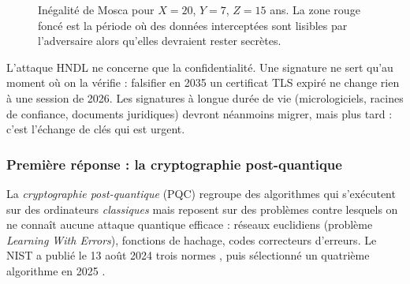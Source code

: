 \begin{figure}[!ht]
\centering
{}
\caption{Inégalité de Mosca pour $X=20$, $Y=7$, $Z=15$ ans. La zone rouge foncé est la période où des données
interceptées sont lisibles par l'adversaire alors qu'elles devraient rester secrètes.}
\label{fig:mosca}
\end{figure}

\begin{remarque}
L'attaque HNDL ne concerne que la confidentialité. Une signature ne sert qu'au moment où on la vérifie : falsifier en 2035 un
certificat TLS expiré ne change rien à une session de 2026. Les signatures à longue durée de vie (micrologiciels,
racines de confiance, documents juridiques) devront néanmoins migrer, mais plus tard : c'est l'échange de clés qui est
urgent.
\end{remarque}

\subsubsection{Première réponse : la cryptographie post-quantique}

La \emph{cryptographie post-quantique} (PQC) regroupe des algorithmes qui s'exécutent sur des ordinateurs
\emph{classiques} mais reposent sur des problèmes contre lesquels on ne connaît aucune attaque quantique efficace :
réseaux euclidiens (problème \emph{Learning With Errors}), fonctions de hachage, codes correcteurs d'erreurs. Le NIST a
publié le 13 août 2024 trois normes \parencite{fips203,fips204,fips205}, puis sélectionné un quatrième algorithme en 2025 \parencite{nist2025hqc}.

